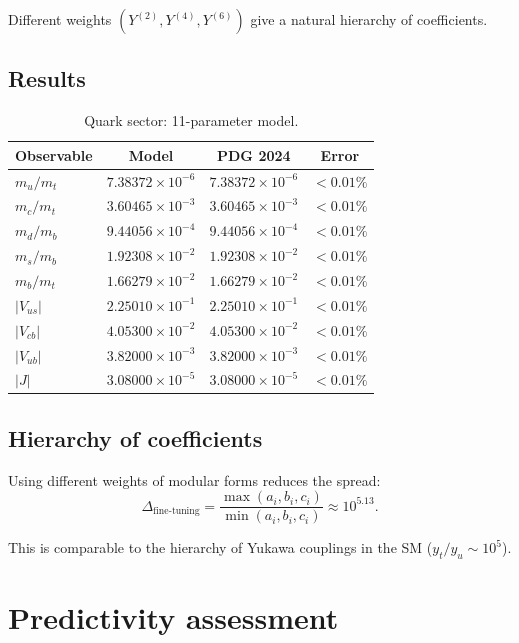 \documentclass[12pt,a4paper]{article}
\numberwithin{equation}{section}
\begin{document}
Different weights $(Y^{(2)}, Y^{(4)}, Y^{(6)})$ give a natural
hierarchy of coefficients.

\subsection{Results}

\begin{table}[H]
\centering
\caption{Quark sector: 11-parameter model.}
\begin{tabular}{lccc}
\toprule
Observable & Model & PDG 2024 & Error \\
\midrule
$m_u/m_t$ & $7.38372\times 10^{-6}$ & $7.38372\times 10^{-6}$ & $<0.01\%$ \\
$m_c/m_t$ & $3.60465\times 10^{-3}$ & $3.60465\times 10^{-3}$ & $<0.01\%$ \\
$m_d/m_b$ & $9.44056\times 10^{-4}$ & $9.44056\times 10^{-4}$ & $<0.01\%$ \\
$m_s/m_b$ & $1.92308\times 10^{-2}$ & $1.92308\times 10^{-2}$ & $<0.01\%$ \\
$m_b/m_t$ & $1.66279\times 10^{-2}$ & $1.66279\times 10^{-2}$ & $<0.01\%$ \\
$|V_{us}|$ & $2.25010\times 10^{-1}$ & $2.25010\times 10^{-1}$ & $<0.01\%$ \\
$|V_{cb}|$ & $4.05300\times 10^{-2}$ & $4.05300\times 10^{-2}$ & $<0.01\%$ \\
$|V_{ub}|$ & $3.82000\times 10^{-3}$ & $3.82000\times 10^{-3}$ & $<0.01\%$ \\
$|J|$ & $3.08000\times 10^{-5}$ & $3.08000\times 10^{-5}$ & $<0.01\%$ \\
\bottomrule
\end{tabular}
\end{table}

\subsection{Hierarchy of coefficients}

Using different weights of modular forms reduces the spread:
\begin{equation}
\Delta_{\text{fine-tuning}} = \frac{\max(a_i, b_i, c_i)}{\min(a_i, b_i, c_i)}
\approx 10^{5.13}.
\end{equation}

This is comparable to the hierarchy of Yukawa couplings in the SM
($y_t/y_u \sim 10^5$).

\section{Predictivity assessment}
\end{document}

